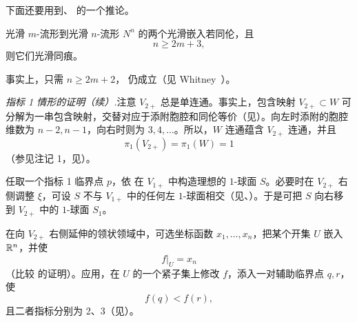 下面还要用到、 的一个推论。

光滑 $m$-流形到光滑 $n$-流形 $N^n$ 的两个光滑嵌入若同伦，且
\[
  n\geq2m+3,
\]
则它们光滑同痕。

\Remark 事实上，只需 $n\geq2m+2$， 仍成立（见 Whitney~\cite{ref16}）。

\par\medskip\noindent\textit{ 指标 1 情形的证明（续）.}\quad 注意 $V_{2+}$ 总是单连通。事实上，包含映射 $V_{2+}\subset W$ 可分解为一串包含映射，交替对应于添附胞腔和同伦等价（见）。向左时添附的胞腔维数为 $n-2,n-1$，向右时则为 $3,4,\ldots$。所以，$W$ 连通蕴含 $V_{2+}$ 连通，并且
\[
  \pi_1(V_{2+})=\pi_1(W)=1
\]
（参见注记 1，见）。

任取一个指标 1 临界点 $p$，依 在 $V_{1+}$ 中构造理想的 $1$-球面 $S$。必要时在 $V_{2+}$ 右侧调整 $\xi$，可设 $S$ 不与 $V_{1+}$ 中的任何左 $1$-球面相交（见、）。于是可把 $S$ 向右移到 $V_{2+}$ 中的 $1$-球面 $S_1$。

在向 $V_{2+}$ 右侧延伸的领状领域中，可选坐标函数 $x_1,\ldots,x_n$，把某个开集 $U$ 嵌入 $\mathbb{R}^n$，并使
\[
  f|_U=x_n
\]
（比较 的证明）。应用，在 $U$ 的一个紧子集上修改 $f$，添入一对辅助临界点 $q,r$，使
\[
  f(q)<f(r),
\]
且二者指标分别为 2、3（见）。

